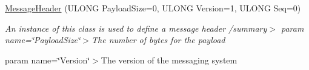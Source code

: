 \begin{DoxyCompactItemize}
\item 
\mbox{\label{class_canberra_1_1_data_types_1_1_serialization_1_1_message_header_a9c3e958012b60987c1ef658dd8ead799}} 
\hyperlink{class_canberra_1_1_data_types_1_1_serialization_1_1_message_header_a9c3e958012b60987c1ef658dd8ead799}{Message\+Header} (U\+L\+O\+NG Payload\+Size=0, U\+L\+O\+NG Version=1, U\+L\+O\+NG Seq=0)
\begin{DoxyCompactList}\small\item\em An instance of this class is used to define a message header /summary$>$ param name=\char`\"{}\+Payload\+Size\char`\"{}$>$The number of bytes for the payload

param name=\char`\"{}\+Version\char`\"{}$>$The version of the messaging system


\end{DoxyCompactList}
\end{DoxyCompactItemize}
